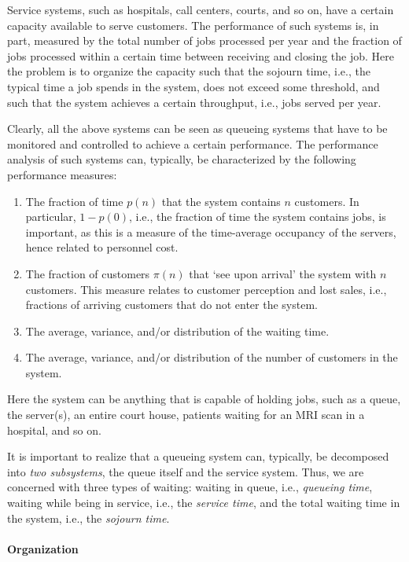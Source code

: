 Service systems, such as hospitals, call centers, courts, and so on,
have a certain capacity available to serve customers. The performance
of such systems is, in part, measured by the total number of jobs
processed per year and the fraction of jobs processed within a certain
time between receiving and closing the job. Here the problem is to
organize the capacity such that the sojourn time, i.e., the typical
time a job spends in the system, does not exceed some threshold, and
such that the system achieves a certain throughput, i.e., jobs served
per year. 

Clearly, all the above systems can be seen as queueing systems that
have to be monitored and controlled to achieve a certain
performance. The performance analysis of such systems can, typically,
be characterized by the following performance measures:
\begin{enumerate}
\item The fraction of time $p(n)$ that the system contains $n$
  customers. In particular, $1-p(0)$, i.e., the fraction of time the
  system contains jobs, is important, as this is a measure of the
  time-average occupancy of the servers, hence related to personnel
  cost.
\item The fraction of customers $\pi(n)$ that `see upon arrival' the
  system with $n$ customers. This measure relates to customer
  perception and lost sales, i.e., fractions of arriving customers
  that do not enter the system.
\item The average, variance, and/or distribution of the waiting time.
\item The average, variance, and/or distribution of the number of customers in the system.\
\end{enumerate}
Here the system can be anything that is capable of holding jobs, such
as a queue, the server(s), an entire court house, patients waiting for
an MRI scan in a hospital, and so on.

It is important to realize that a queueing system can, typically, be
decomposed into \emph{two subsystems}, the queue itself and the
service system. Thus, we are concerned with three types of waiting:
waiting in queue, i.e., \emph{queueing time}, waiting while being in
service, i.e., the \emph{service time}, and the total waiting time in
the system, i.e., the \emph{sojourn time}.

\paragraph{Organization}


